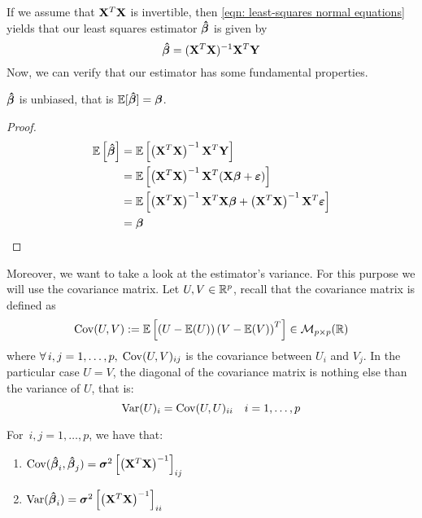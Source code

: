 If we assume that \( \mathbf{X}^T \mathbf{X} \) is invertible, then \eqref{eqn: least-squares normal equations} yields that our least squares estimator \( \boldsymbol{\hat{\beta}} \) is given by
\begin{equation}
    \label{eqn: least squares estimator}
    \boldsymbol{\hat{\beta}} = (\mathbf{X}^T \mathbf{X})^{-1} \mathbf{X}^T \mathbf{Y}
\end{equation}
Now, we can verify that our estimator has some fundamental properties.
\begin{proposition}
    \(\boldsymbol{\hat{\beta}}\) is unbiased, that is $\mathbb{E} [\boldsymbol{\hat{\beta}}] = \boldsymbol{\beta}$.
\end{proposition}
\begin{proof}
    \begin{align*}
        \mathbb{E} \left[ \boldsymbol{\hat{\beta}} \right]
         & = \mathbb{E} \left[ \left(\mathbf{X}^{T} \mathbf{X} \right)^{-1} \mathbf{X}^{T} \mathbf{Y} \right]                                                \\
         & = \mathbb{E} \left[ \left(\mathbf{X}^{T} \mathbf{X} \right)^{-1} \mathbf{X}^{T}(\mathbf{X} \boldsymbol{\beta} + \boldsymbol{\varepsilon})\right]                                    \\
         & = \mathbb{E} \left[ \left(\mathbf{X}^{T} \mathbf{X} \right)^{-1} \mathbf{X}^{T} \mathbf{X} \boldsymbol{\beta} + \left(\mathbf{X}^{T} \mathbf{X}\right)^{-1} \mathbf{X}^{T} \boldsymbol{\varepsilon} \right] \\
         & = \boldsymbol{\beta}
    \end{align*}

\end{proof}
Moreover, we want to take a look at the estimator's variance. For this purpose we will use the covariance matrix. Let \(U, V \in \mathbb{R}^p\), recall that the covariance matrix is defined as
\[
    \operatorname{Cov} (U, V) := \mathbb{E} \left[ \left( U - \mathbb{E} (U) \right) \left( V - \mathbb{E} (V) \right)^T \right] \in \mathcal{M}_{p \times p}(\mathbb{R})
\]
where \(\forall \, i, j = 1, \ldots, p, \; \operatorname{Cov} (U, V)_{ij}\) is the covariance between \( U_i \) and \( V_j\). In the particular case \( U = V \), the diagonal of the covariance matrix is nothing else than the variance of \( U \), that is:
\[
    \operatorname{Var} (U)_i = \operatorname{Cov} (U, U)_{ii} \quad i = 1, \ldots, p
\]
\begin{proposition}
    For \( \, i, j = 1, \ldots, p\), we have that:
    \begin{enumerate}[label=(\roman*)]
        \item \(\operatorname{Cov} (\boldsymbol{\hat{\beta}}_i, \boldsymbol{\hat{\beta}}_j) = \boldsymbol{\sigma}^{2} \left[ \left( \mathbf{X}^T \mathbf{X} \right)^{-1} \right]_{ij}\)
        \item \(\operatorname{Var} (\boldsymbol{\hat{\beta}}_i) = \boldsymbol{\sigma}^{2} \left[ \left( \mathbf{X}^T \mathbf{X} \right)^{-1} \right]_{ii}\)
    \end{enumerate}
\end{proposition}
